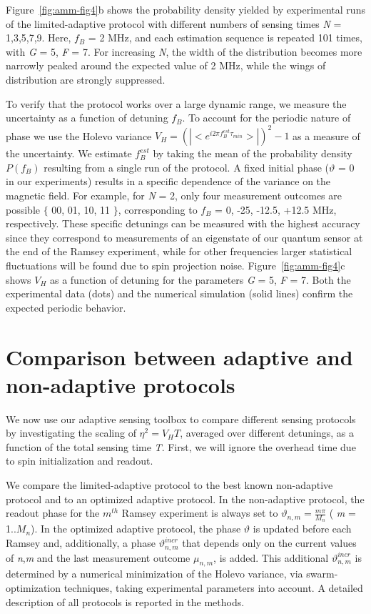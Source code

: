 Figure \,\ref{fig:amm-fig4}b shows the probability density yielded by experimental runs of the limited-adaptive protocol with different numbers of sensing times \textit{N} = 1,3,5,7,9. Here,  $f_B$ = 2 MHz, and each estimation sequence is repeated 101 times, with \textit{G} = 5, \textit{F} = 7. For increasing \textit{N}, the width of the distribution becomes more narrowly peaked around the expected value of 2 MHz, while the wings of distribution are strongly suppressed. 

To verify that the protocol works over a large dynamic range, we measure the uncertainty as a function of detuning $f_B$. To account for the periodic nature of phase we use the Holevo variance $V_H = (|<e^{i2 \pi f_B^{est} \tau_{min}}>|)^2 - 1$ as a measure of the uncertainty. We estimate  $f_B^{est}$ by taking the mean of the probability density $P(f_B)$ resulting from a single run of the protocol. A fixed initial phase ($\vartheta$ = 0 in our experiments) results in a specific dependence of the variance on the magnetic field. For example, for \textit{N} = 2, only four measurement outcomes are possible $\{$ 00, 01, 10, 11 $\}$, corresponding to $f_B$ = 0, -25, -12.5, +12.5 MHz, respectively. These specific detunings can be measured with the highest accuracy since they correspond to measurements of an eigenstate of our quantum sensor at the end of the Ramsey experiment, while for other frequencies larger statistical fluctuations will be found due to spin projection noise. Figure \,\ref{fig:amm-fig4}c shows $V_H$ as a function of detuning for the parameters \textit{G} = 5, \textit{F} = 7. Both the experimental data (dots) and the numerical simulation (solid lines) confirm the expected periodic behavior.

\section{Comparison between adaptive and non-adaptive protocols}
We now use our adaptive sensing toolbox to compare different sensing protocols by investigating the scaling of $\eta^2 = V_H T$, averaged over different detunings, as a function of the total sensing time \textit{T}. First, we will ignore the overhead time due to spin initialization and readout. 

We compare the limited-adaptive protocol to the best known non-adaptive protocol and to an optimized adaptive protocol. In the non-adaptive protocol\cite{Said_Phys.Rev.B_2011,Waldherr_NatNano_2012,Nusran_NatNano_2012}, the readout phase for the $m^{th}$ Ramsey experiment is always set to $\vartheta_{n,m} = \frac{m\pi}{M_n}$  ( \textit{m} = 1..$M_n$). In the optimized adaptive protocol\cite{Hentschel_Phys.Rev.Lett._2010,Hayes_Phys.Rev.A_2014}, the phase $\vartheta$ is updated before each Ramsey and, additionally, a phase $\vartheta_{n,m}^{incr}$ that depends only on the current values of \textit{n},\textit{m} and the last measurement outcome $\mu_{n,m}$, is added. This additional $\vartheta_{n,m}^{incr}$ is determined by a numerical minimization of the Holevo variance, via swarm-optimization techniques, taking experimental parameters into account. A detailed description of all protocols is reported in the methods.


